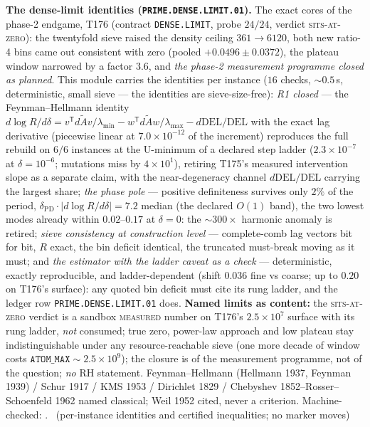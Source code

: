 \par\smallskip\noindent\textbf{The dense-limit identities
(\texttt{PRIME.DENSE.LIMIT.01}).}
The exact cores of the phase-2 endgame, T176 (contract
\texttt{DENSE.LIMIT}, probe $24/24$, verdict \textsc{sits-at-zero}):
the twentyfold sieve raised the density ceiling $361\to6120$, both new
ratio-4 bins came out consistent with zero (pooled $+0.0496\pm0.0372$),
the plateau window narrowed by a factor $3.6$, and \emph{the phase-2
measurement programme closed as planned}. This module carries the
identities per instance ($16$ checks, ${\sim}0.5$\,s, deterministic,
small sieve --- the identities are sieve-size-free): \emph{R1 closed}
--- the Feynman--Hellmann identity $d\log R/d\delta
=v^{\mathsf T}d\tilde Av/\lambda_{\min}
-w^{\mathsf T}d\tilde Aw/\lambda_{\max}-d\mathrm{DEL}/\mathrm{DEL}$
with the exact lag derivative (piecewise linear at $7.0\times10^{-12}$
of the increment) reproduces the full rebuild on $6/6$ instances at
the U-minimum of a declared step ladder ($2.3\times10^{-7}$ at
$\delta=10^{-6}$; mutations miss by $4\times10^{1}$), retiring T175's
measured intervention slope as a separate claim, with the
near-degeneracy channel $d\mathrm{DEL}/\mathrm{DEL}$ carrying the
largest share; \emph{the phase pole} --- positive definiteness
survives only $2\%$ of the period,
$\delta_{\mathrm{PD}}\cdot|d\log R/d\delta|=7.2$ median (the declared
$O(1)$ band), the two lowest modes already within $0.02$--$0.17$ at
$\delta=0$: the ${\sim}300\times$ harmonic anomaly is retired;
\emph{sieve consistency at construction level} --- complete-comb lag
vectors bit for bit, $R$ exact, the bin deficit identical, the
truncated must-break moving as it must; and \emph{the estimator with
the ladder caveat as a check} --- deterministic, exactly reproducible,
and ladder-dependent (shift $0.036$ fine vs coarse; up to $0.20$ on
T176's surface): any quoted bin deficit must cite its rung ladder, and
the ledger row \texttt{PRIME.DENSE.LIMIT.01} does.
\textbf{Named limits as content:} the \textsc{sits-at-zero} verdict is
a sandbox \textsc{measured} number on T176's $2.5\times10^{7}$ surface
with its rung ladder, \emph{not} consumed; true zero, power-law
approach and low plateau stay indistinguishable under any
resource-reachable sieve (one more decade of window costs
$\mathtt{ATOM\_MAX}\sim2.5\times10^{9}$); the closure is of the
measurement programme, not of the question; \emph{no} RH statement.
Feynman--Hellmann (Hellmann 1937, Feynman 1939) / Schur 1917 / KMS
1953 / Dirichlet 1829 / Chebyshev 1852--Rosser--Schoenfeld 1962 named
classical; Weil 1952 cited, never a criterion. Machine-checked:
.
\mE\ (per-instance identities and certified inequalities; no marker moves)
\par\smallskip


